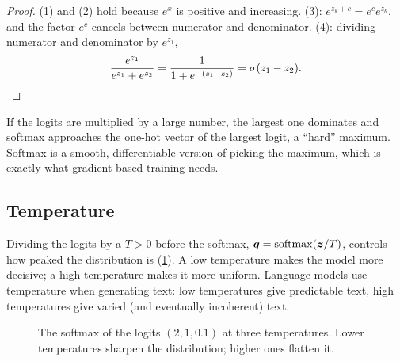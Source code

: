 \begin{proof}
(1) and (2) hold because $e^x$ is positive and increasing. (3):
$e^{z_k + c} = e^ce^{z_k}$, and the factor $e^c$ cancels between numerator and
denominator. (4): dividing numerator and denominator by $e^{z_1}$,
\[
  \frac{e^{z_1}}{e^{z_1} + e^{z_2}} = \frac{1}{1 + e^{-(z_1 - z_2)}}
  = \sigma(z_1 - z_2). \qedhere
\]
\end{proof}

\begin{intuition}
If the logits are multiplied by a large number, the largest one dominates and
softmax approaches the one-hot vector of the largest logit, a ``hard'' maximum.
Softmax is a smooth, differentiable version of picking the maximum, which is
exactly what gradient-based training needs.
\end{intuition}

\subsection{Temperature}

Dividing the logits by a  $T > 0$ before the softmax,
$\bm{q} = \operatorname{softmax}(\bm{z}/T)$, controls how peaked the distribution is
(\cref{fig:temperature}). A low temperature makes the model more decisive; a high
temperature makes it more uniform. Language models use temperature when
generating text: low temperatures give predictable text, high temperatures give
varied (and eventually incoherent) text.

\begin{figure}[htbp]
\centering
{}
\caption{The softmax of the logits $(2, 1, 0.1)$ at three temperatures. Lower
  temperatures sharpen the distribution; higher ones flatten it.}
\label{fig:temperature}
\end{figure}

